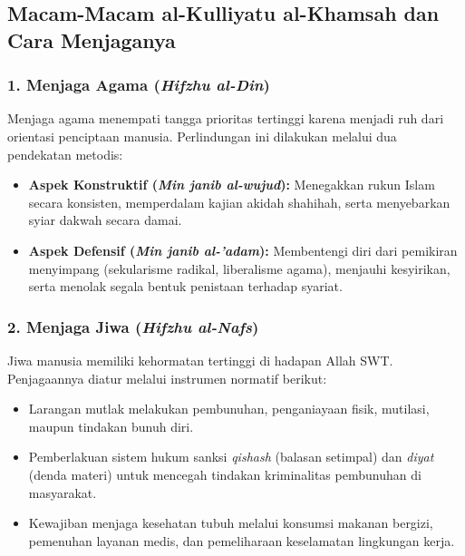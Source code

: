\documentclass[12pt, a4paper]{article}
\begin{document}
\subsection{Macam-Macam al-Kulliyatu al-Khamsah dan Cara Menjaganya}

\subsubsection{1. Menjaga Agama (\textit{Hifzhu al-Din})}
Menjaga agama menempati tangga prioritas tertinggi karena menjadi ruh dari orientasi penciptaan manusia. Perlindungan ini dilakukan melalui dua pendekatan metodis:
\begin{itemize}
    \item \textbf{Aspek Konstruktif (\textit{Min janib al-wujud}):} Menegakkan rukun Islam secara konsisten, memperdalam kajian akidah shahihah, serta menyebarkan syiar dakwah secara damai.
    \item \textbf{Aspek Defensif (\textit{Min janib al-'adam}):} Membentengi diri dari pemikiran menyimpang (sekularisme radikal, liberalisme agama), menjauhi kesyirikan, serta menolak segala bentuk penistaan terhadap syariat.
\end{itemize}

\subsubsection{2. Menjaga Jiwa (\textit{Hifzhu al-Nafs})}
Jiwa manusia memiliki kehormatan tertinggi di hadapan Allah SWT. Penjagaannya diatur melalui instrumen normatif berikut:
\begin{itemize}
    \item Larangan mutlak melakukan pembunuhan, penganiayaan fisik, mutilasi, maupun tindakan bunuh diri.
    \item Pemberlakuan sistem hukum sanksi \textit{qishash} (balasan setimpal) dan \textit{diyat} (denda materi) untuk mencegah tindakan kriminalitas pembunuhan di masyarakat.
    \item Kewajiban menjaga kesehatan tubuh melalui konsumsi makanan bergizi, pemenuhan layanan medis, dan pemeliharaan keselamatan lingkungan kerja.
\end{itemize}
\end{document}
